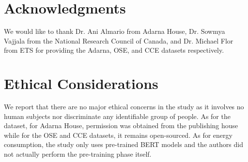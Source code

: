 \documentclass[11pt,a4paper]{article}
\begin{document}
\section{Acknowledgments}
We would like to thank Dr. Ani Almario from Adarna House, Dr. Sowmya Vajjala from the National Research Council of Canada, and Dr. Michael Flor from ETS for providing the Adarna, OSE, and CCE datasets respectively.

\section{Ethical Considerations}
We report that there are no major ethical concerns in the study as it involves no human subjects nor discriminate any identifiable group of people. As for the dataset, for Adarna House, permission was obtained from the publishing house while for the OSE and CCE datasets, it remains open-sourced. As for energy consumption, the study only uses pre-trained BERT models and the authors did not actually perform the pre-training phase itself.




\end{document}
